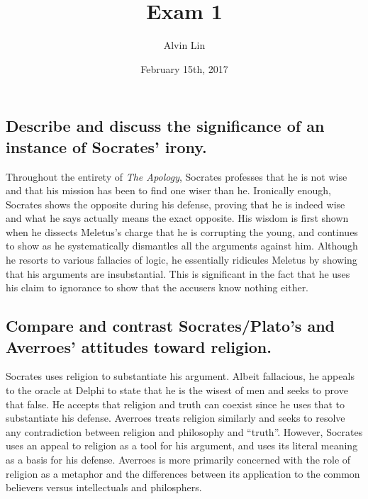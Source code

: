 \documentclass[letterpaper, 12pt]{article}
\title{Exam 1}
\author{Alvin Lin}
\date{February 15th, 2017}
\begin{document}
\maketitle

\subsection*{Describe and discuss the significance of an instance of Socrates'
irony.}
Throughout the entirety of \textit{The Apology}, Socrates professes that he is not wise and that his mission has been to find one wiser than he. Ironically enough, Socrates shows the opposite during his defense, proving that he is indeed wise and what he says actually means the exact opposite. His wisdom is first shown when he dissects Meletus's charge that he is corrupting the young, and continues to show as he systematically dismantles all the arguments against him. Although he resorts to various fallacies of logic, he essentially ridicules Meletus by showing that his arguments are insubstantial. This is significant in the fact that he uses his claim to ignorance to show that the accusers know nothing either.

\subsection*{Compare and contrast Socrates/Plato's and Averroes' attitudes
toward religion.}
Socrates uses religion to substantiate his argument. Albeit fallacious, he appeals to the oracle at Delphi to state that he is the wisest of men and seeks to prove that false. He accepts that religion and truth can coexist since he uses that to substantiate his defense. Averroes treats religion similarly and seeks to resolve any contradiction between religion and philosophy and ``truth''. However, Socrates uses an appeal to religion as a tool for his argument, and uses its literal meaning as a basis for his defense. Averroes is more primarily concerned with the role of religion as a metaphor and the differences between its application to the common believers versus intellectuals and philosphers.
\end{document}
